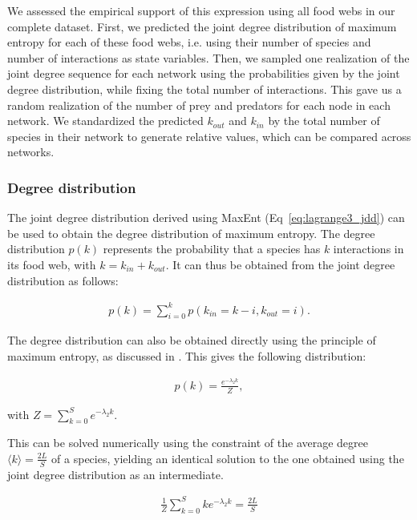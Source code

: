 We assessed the empirical support of this expression using all food webs in our
complete dataset. First, we predicted the joint degree distribution of maximum
entropy for each of these food webs, i.e. using their number of species and
number of interactions as state variables. Then, we sampled one realization of
the joint degree sequence for each network using the probabilities given by the
joint degree distribution, while fixing the total number of interactions. This
gave us a random realization of the number of prey and predators for each node
in each network. We standardized the predicted $k_{out}$ and $k_{in}$ by the
total number of species in their network to generate relative values, which can
be compared across networks.

\subsubsection{Degree distribution} 

The joint degree distribution derived using MaxEnt (Eq~\ref{eq:lagrange3_jdd})
can be used to obtain the degree distribution of maximum entropy. The degree
distribution $p(k)$ represents the probability that a species has $k$
interactions in its food web, with $k = k_{in} + k_{out}$. It can thus be
obtained from the joint degree distribution as follows: 

\begin{eqnarray}
\label{eq:dd_jdd}
       p(k) = \sum_{i=0}^k p(k_{in} = k - i, k_{out} = i).
\end{eqnarray}

The degree distribution can also be obtained directly using the principle of
maximum entropy, as discussed in \textcite{Williams2011Biology}. This gives the
following distribution: 

\begin{eqnarray}
\label{eq:lagrange_dd}
       p(k) = \frac{e^{-\lambda_2k}}{Z},
\end{eqnarray}

with $Z = \sum_{k=0}^S e^{-\lambda_2k}.$

This can be solved numerically using the constraint of the average degree
$\langle k \rangle = \frac{2L}{S}$ of a species, yielding an identical solution
to the one obtained using the joint degree distribution as an intermediate. 

\begin{eqnarray}
\label{eq:lagrange2_dd}
       \frac{1}{Z}\sum_{k=0}^S k e^{-\lambda_2k} = \frac{2L}{S}
\end{eqnarray}

